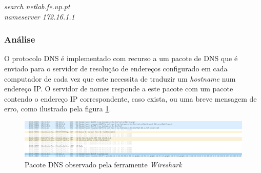 \documentclass{article}
\begin{document}
\textit{search netlab.fe.up.pt}\\
\textit{nameserver 172.16.1.1}

\subsubsection{Análise}
O protocolo DNS é implementado com recurso a um pacote de DNS que é enviado para o servidor de resolução de endereços configurado em cada computador de cada vez que este necessita de traduzir um \textit{hostname} num endereço IP. O servidor de nomes responde a este pacote com um pacote contendo o endereço IP correspondente, caso exista, ou uma breve mensagem de erro, como ilustrado pela figura \ref{fig:dns}.

\begin{figure}
\centering
\includegraphics[width=1.0\textwidth]{dns.png}
\caption{Pacote DNS observado pela ferramente \textit{Wireshark} }
\label{fig:dns}
\end{figure}
\end{document}
